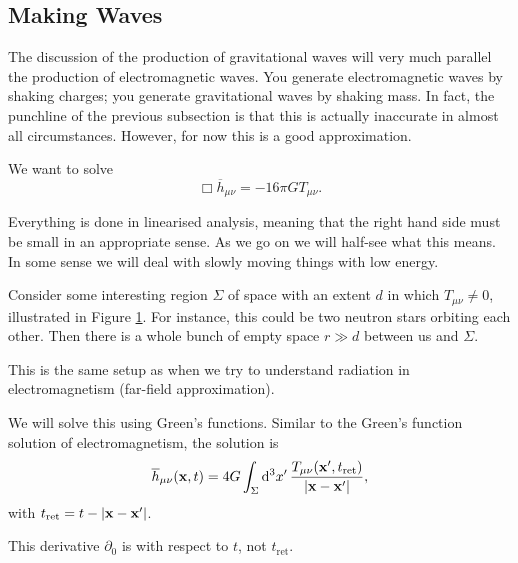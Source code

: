 
\subsection{Making Waves}%
\label{sub:making_waves}

The discussion of the production of gravitational waves will very much parallel the production of electromagnetic waves.
You generate electromagnetic waves by shaking charges; you generate gravitational waves by shaking mass.
In fact, the punchline of the previous subsection is that this is actually inaccurate in almost all circumstances. However, for now this is a good approximation.

We want to solve
\begin{equation}
  \label{eq:22-1}
  \Box \overline{h}_{\mu\nu} = -16\pi G T_{\mu\nu}.
\end{equation}

Everything is done in linearised analysis, meaning that the right hand side  must be small in an appropriate sense.
As we go on we will half-see what this means. In some sense we will deal with slowly moving things with low energy.

\begin{figure}[tbhp]
  \centering
  \def\svgwidth{0.4\columnwidth}
  
  \caption{}
  \label{fig:l22f1}
\end{figure}

Consider some interesting region $\Sigma$ of space with an extent $d$ in which  $T_{\mu\nu} \neq 0$, illustrated in Figure \ref{fig:l22f1}. For instance, this could be two neutron stars orbiting each other.
Then there is a whole bunch of empty space $r \gg d$  between us and $\Sigma$.
\begin{leftbar}
  \begin{note}
    This is the same setup as when we try to understand radiation in electromagnetism (far-field approximation).
  \end{note}
\end{leftbar}

We will solve this using Green's functions.
Similar to the Green's function solution of electromagnetism, the solution is
\begin{equation}
  \overline{h}_{\mu\nu}(\vb{x}, t) = 4 G \int_\Sigma \dd[3]{x'} \frac{T_{\mu\nu}(\vb{x}', t_{\text{ret}})}{\abs{\vb{x} - \vb{x}'}},
\end{equation} 
with $t_{\text{ret}} = t - \abs{\vb{x} - \vb{x}'}$.
\begin{remark}
  This derivative $\partial_0$ is with respect to $t$, not $t_{\text{ret}}$.
\end{remark}

